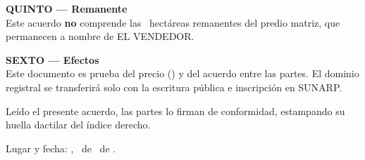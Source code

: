 \documentclass[12pt,a4paper]{article}
\begin{document}
\vspace{0.45em}
\noindent\textbf{QUINTO --- Remanente}\\[0.15em]
Este acuerdo \textbf{no} comprende las \AreaRemanenteHa\ hectáreas remanentes del predio matriz, que permanecen a nombre de EL VENDEDOR.

\vspace{0.45em}
\noindent\textbf{SEXTO --- Efectos}\\[0.15em]
Este documento es prueba del precio (\MontoPago) y del acuerdo entre las partes. El dominio registral se transferirá solo con la escritura pública e inscripción en SUNARP.

\vspace{0.85em}
\noindent Leído el presente acuerdo, las partes lo firman de conformidad, estampando su huella dactilar del índice derecho.

\vspace{1.1em}
\noindent Lugar y fecha: \textbf{\LugarOtorgamiento}, \DiaOtorgamiento\ de \MesOtorgamiento\ de \AnioOtorgamiento.

\vspace{1.35em}

\vspace{1.1em}
\\[0.35em]
\noindent
{}
\hfill
{}
\end{document}
